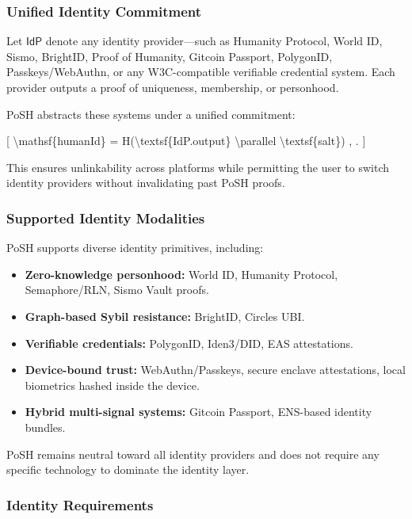 \documentclass{article}
\begin{document}
\subsubsection{Unified Identity Commitment}

Let $\textsf{IdP}$ denote any identity provider---such as Humanity Protocol,
World ID, Sismo, BrightID, Proof of Humanity, Gitcoin Passport, PolygonID,
Passkeys/WebAuthn, or any W3C-compatible verifiable credential system. Each
provider outputs a proof of uniqueness, membership, or personhood.

PoSH abstracts these systems under a unified commitment:

[
{\textbackslash}mathsf\{humanId\} = H({\textbackslash}textsf\{IdP.output\} {\textbackslash}parallel {\textbackslash}textsf\{salt\}) , .
]

This ensures unlinkability across platforms while permitting the user to switch
identity providers without invalidating past PoSH proofs.

\subsubsection{Supported Identity Modalities}

PoSH supports diverse identity primitives, including:

\begin{itemize}
\item \textbf{Zero-knowledge personhood:} World ID, Humanity Protocol,
Semaphore/RLN, Sismo Vault proofs.
\item \textbf{Graph-based Sybil resistance:} BrightID, Circles UBI.
\item \textbf{Verifiable credentials:} PolygonID, Iden3/DID, EAS attestations.
\item \textbf{Device-bound trust:} WebAuthn/Passkeys, secure enclave
attestations, local biometrics hashed inside the device.
\item \textbf{Hybrid multi-signal systems:} Gitcoin Passport, ENS-based
identity bundles.
\end{itemize}

PoSH remains neutral toward all identity providers and does not require any
specific technology to dominate the identity layer.

\subsubsection{Identity Requirements}
\end{document}
